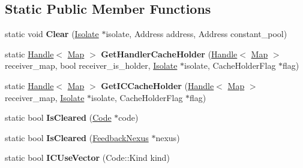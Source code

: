 \subsection*{Static Public Member Functions}
\begin{DoxyCompactItemize}
\item 
static void {\bfseries Clear} (\hyperlink{classv8_1_1internal_1_1_isolate}{Isolate} $\ast$isolate, Address address, Address constant\+\_\+pool)\hypertarget{classv8_1_1internal_1_1_i_c_acc4ce8767a472b1f21cd31be5025260c}{}\label{classv8_1_1internal_1_1_i_c_acc4ce8767a472b1f21cd31be5025260c}

\item 
static \hyperlink{classv8_1_1internal_1_1_handle}{Handle}$<$ \hyperlink{classv8_1_1internal_1_1_map}{Map} $>$ {\bfseries Get\+Handler\+Cache\+Holder} (\hyperlink{classv8_1_1internal_1_1_handle}{Handle}$<$ \hyperlink{classv8_1_1internal_1_1_map}{Map} $>$ receiver\+\_\+map, bool receiver\+\_\+is\+\_\+holder, \hyperlink{classv8_1_1internal_1_1_isolate}{Isolate} $\ast$isolate, Cache\+Holder\+Flag $\ast$flag)\hypertarget{classv8_1_1internal_1_1_i_c_a74422d93515a318265396127e42e2a4f}{}\label{classv8_1_1internal_1_1_i_c_a74422d93515a318265396127e42e2a4f}

\item 
static \hyperlink{classv8_1_1internal_1_1_handle}{Handle}$<$ \hyperlink{classv8_1_1internal_1_1_map}{Map} $>$ {\bfseries Get\+I\+C\+Cache\+Holder} (\hyperlink{classv8_1_1internal_1_1_handle}{Handle}$<$ \hyperlink{classv8_1_1internal_1_1_map}{Map} $>$ receiver\+\_\+map, \hyperlink{classv8_1_1internal_1_1_isolate}{Isolate} $\ast$isolate, Cache\+Holder\+Flag $\ast$flag)\hypertarget{classv8_1_1internal_1_1_i_c_a119f8af3858604a13d7cc09c415d6ea8}{}\label{classv8_1_1internal_1_1_i_c_a119f8af3858604a13d7cc09c415d6ea8}

\item 
static bool {\bfseries Is\+Cleared} (\hyperlink{classv8_1_1internal_1_1_code}{Code} $\ast$code)\hypertarget{classv8_1_1internal_1_1_i_c_adc7afc0f4fc8f19853c3d8946c9a2056}{}\label{classv8_1_1internal_1_1_i_c_adc7afc0f4fc8f19853c3d8946c9a2056}

\item 
static bool {\bfseries Is\+Cleared} (\hyperlink{classv8_1_1internal_1_1_feedback_nexus}{Feedback\+Nexus} $\ast$nexus)\hypertarget{classv8_1_1internal_1_1_i_c_a9dfb16f1c1b166b4eb56040f282cb976}{}\label{classv8_1_1internal_1_1_i_c_a9dfb16f1c1b166b4eb56040f282cb976}

\item 
static bool {\bfseries I\+C\+Use\+Vector} (Code\+::\+Kind kind)\hypertarget{classv8_1_1internal_1_1_i_c_a1827a4122a1b90774f45eccd939cb34e}{}\label{classv8_1_1internal_1_1_i_c_a1827a4122a1b90774f45eccd939cb34e}

\end{DoxyCompactItemize}

